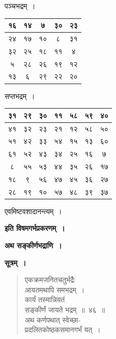 \documentclass[11pt, openany]{book}
\begin{document}
\begin{center}	
पञ्चभद्रम्~।
\vspace{3mm}

\begin{tabular}{|c|c|c|c|c|}
	\hline
	१६ & १४ & ७ & ३० & २३ \\
	\hline
	२४ & १७ & १० & ८ & ३१\\
	\hline
	३२ & २५ & १८ & ११ & ४\\
	\hline
	५ & २८ & २६ & १९ & १२\\
	\hline
	१३ & ६ & २९ & २२ & २०\\
	\hline
\end{tabular}
\vspace{3mm}

सप्तभद्रम्~।
\vspace{3mm}

\begin{tabular}{|c|c|c|c|c|c|c|}
	\hline
	३१ & २९ & ३० & ११ & ५८ & ५९ & ४०\\
	\hline
	४१ & ३२ & २३ & २१ & १२ & ५८ & ५०\\
	\hline
	५१ & ४२ & ३३ & ५४ & १५ & १३ & ६०\\
	\hline
	६१ & ५२ & ४३ & ३४ & २५ & १६ & ७ \\
	\hline
	८ & ५५ & ५३  & ४४ & ३५ & २६ & १७\\
	\hline
	१८ & ९ & ५६ & ४७ & ४५ & ३६ & २७\\
	\hline
	२८ & १९ & १० & ५७ & ४८ & ३९ & ३७\\
	\hline
\end{tabular}
\end{center}

एवमिष्टवशादानन्त्यम्~।

\begin{center}	
\textbf{इति विषमगर्भप्रकरणम्~।}\\ 
\vspace{6mm}

\textbf{अथ सङ्कीर्णभद्राणि~।}
\end{center}

\textbf{सूत्रम्~।}
\begin{quote}
{\gk एकक्रमजनितचतुर्भद्रैः\\
आयतमथापि समभद्रम्~।\\
कार्यं तस्मान्नियतं\\
सङ्कीर्णं जायते भद्रम्~॥~४६~॥\\
अथ कर्णपथात् स्वेच्छा-\\
प्रदलितकोष्ठकसमानगर्भं यत्~।}
\end{quote}
\end{document}
